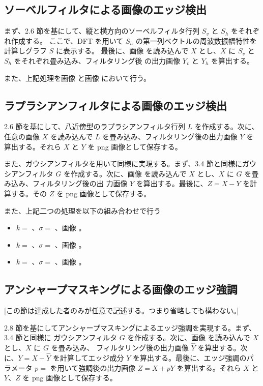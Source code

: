 \documentclass[dvipdfmx]{jsarticle}
\begin{document}
\subsection{ソーベルフィルタによる画像のエッジ検出}

まず、2.6 節を基にして、縦と横方向のソーベルフィルタ行列 $S_v$ と $S_h$ をそれぞれ作成する。
ここで、DFT を用いて $S_h$ の第一列ベクトルの周波数振幅特性を計算しグラフ $S$ に表示する。
最後に、画像 を読み込んで $X$ とし、$X$ に $S_v$ と $S_h$ をそれぞれ畳み込み、フィルタリング後
の出力画像 $Y_v$ と $Y_h$ を算出する。

また、上記処理を画像 と画像 において行う。

\subsection{ラプラシアンフィルタによる画像のエッジ検出}

2.6 節を基にして、八近傍型のラプラシアンフィルタ行列 $L$ を作成する。次に、任意の画像 $X$
を読み込んで $L$ を畳み込み、フィルタリング後の出力画像 $Y$ を算出する。それら $X$ と $Y$ を png
画像として保存する。

また、ガウシアンフィルタを用いて同様に実現する。まず、3.4 節と同様にガウシアンフィルタ
$G$ を作成する。次に、画像 を読み込んで $X$ とし、$X$ に $G$ を畳み込み、フィルタリング後の出
力画像 $Y$ を算出する。最後に、$Z=X-Y$ を計算する。その $Z$ を png 画像として保存する。

また、上記二つの処理を以下の組み合わせで行う

\begin{itemize}
\item $k =$ 、$\sigma =$ 、画像 。
\item $k =$ 、$\sigma =$ 、画像 。
\item $k =$ 、$\sigma =$ 、画像 。
\end{itemize}

\subsection{アンシャープマスキングによる画像のエッジ強調}

[この節は達成した者のみが任意で記述する。つまり省略しても構わない。]

2.8 節を基にしてアンシャープマスキングによるエッジ強調を実現する。まず、3.4 節と同様に
ガウシアンフィルタ $G$ を作成する。次に、画像 を読み込んで $X$ とし、$X$ に $G$ を畳み込み、
フィルタリング後の出力画像 $\hat{Y}$ を算出する。次に、$Y=X-\hat{Y}$ を計算してエッジ成分
$Y$ を算出する。最後に、エッジ強調のパラメータ $p =$ を用いて強調後の出力画像
$Z=X+pY$ を算出する。それら $X$ と $Y$、$Z$ を png 画像として保存する。
\end{document}
